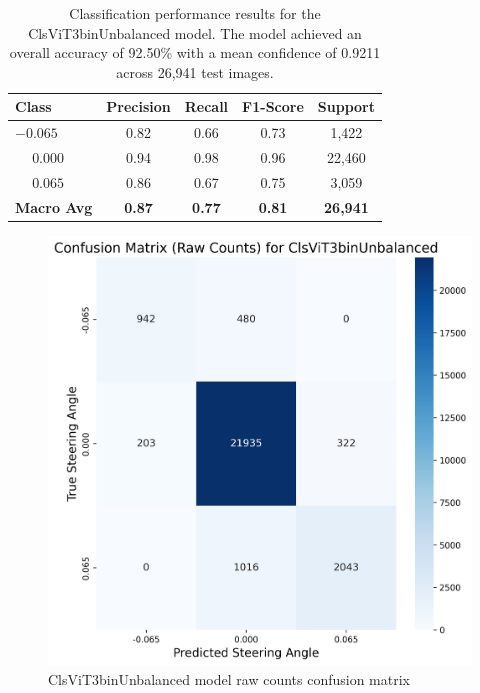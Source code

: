
\begin{table}[htbp]
\centering
\begin{tabular}{@{}lcccc@{}}
\toprule
\textbf{Class} & \textbf{Precision} & \textbf{Recall} & \textbf{F1-Score} & \textbf{Support} \\
\midrule
$-0.065$ & 0.82 & 0.66 & 0.73 & 1,422 \\
$\phantom{-}0.000$ & 0.94 & 0.98 & 0.96 & 22,460 \\
$\phantom{-}0.065$ & 0.86 & 0.67 & 0.75 & 3,059 \\
\midrule
\textbf{Macro Avg} & \textbf{0.87} & \textbf{0.77} & \textbf{0.81} & \textbf{26,941} \\
\bottomrule
\end{tabular}
\caption{Classification performance results for the ClsViT3binUnbalanced model. The model achieved an overall accuracy of 92.50\% with a mean confidence of 0.9211 across 26,941 test images.}
\label{tab:clf_report_ClsViT3binUnbalanced}
\end{table}


\begin{figure}[H]
\centering
\includegraphics[width=0.65\linewidth]{Figures/Results/cm_raw_ClsViT3binUnbalanced.png}
\caption{ClsViT3binUnbalanced model raw counts confusion matrix}
\label{fig:cm_raw_ClsViT3binUnbalanced}
\end{figure}


